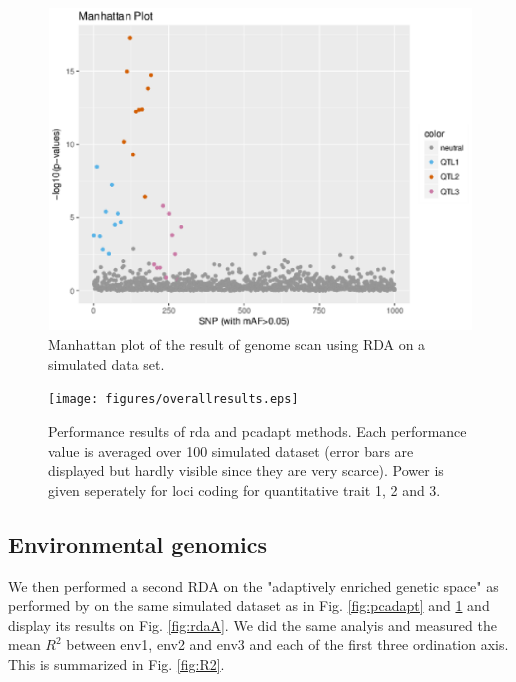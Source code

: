 \documentclass[nogrid]{MBE}%
\begin{document}
\begin{figure}[t]
\begin{center}
\includegraphics[height=0.21\textheight]{figures/sim5_capscale.eps}
\end{center}
\caption{Manhattan plot of the result of genome scan using RDA on a simulated data set.}%
\label{fig:rda}%
\end{figure}


\begin{figure}[t]
\begin{center}
\texttt{[image: figures/overallresults.eps]}
\end{center}
\caption{Performance results of rda and pcadapt methods. Each performance value is averaged over 100 simulated dataset (error bars are displayed but hardly visible since they are very scarce). Power is given seperately for loci coding for quantitative trait 1, 2 and 3.}%
\label{fig:performance}%
\end{figure}

\subsection{Environmental genomics}

We then performed a second RDA on the "adaptively enriched genetic space" as performed by \citet{Steane2014a} on the same simulated dataset as in Fig. \ref{fig:pcadapt} and \ref{fig:rda} and display its results on Fig. \ref{fig:rdaA}. We did the same analyis and measured the mean $R^2$ between env1, env2 and env3 and each of the first three ordination axis. This is summarized in Fig. \ref{fig:R2}.
\end{document}

